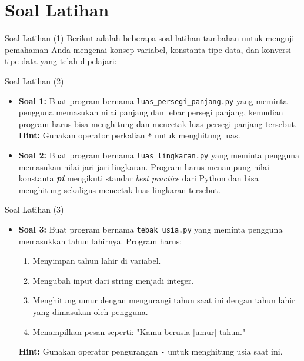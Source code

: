 \documentclass[aspectratio=169, table]{beamer}
\begin{document}
\section{Soal Latihan}
\begin{frame}{Soal Latihan (1)}
Berikut adalah beberapa soal latihan tambahan untuk menguji pemahaman Anda mengenai konsep variabel, konstanta tipe data, dan konversi tipe data yang telah dipelajari:
\end{frame}

\begin{frame}[fragile]{Soal Latihan (2)}
\begin{itemize}
\item \textbf{Soal 1:} Buat program bernama \texttt{luas_persegi_panjang.py} yang meminta pengguna memasukan nilai panjang dan lebar persegi panjang, kemudian program harus bisa menghitung dan mencetak luas persegi panjang tersebut.
\newline \newline
\textbf{Hint:} Gunakan operator perkalian \texttt{*} untuk menghitung luas.

\item \textbf{Soal 2:} Buat program bernama \texttt{luas_lingkaran.py} yang meminta pengguna memasukan nilai jari-jari lingkaran. Program harus menampung nilai konstanta \textbf{\textit{pi}} mengikuti standar \textit{best practice} dari Python dan bisa menghitung sekaligus mencetak luas lingkaran tersebut.

\end{itemize}
\end{frame}

\begin{frame}[fragile]{Soal Latihan (3)}
\begin{itemize}
\item \textbf{Soal 3:} Buat program bernama \texttt{tebak_usia.py} yang meminta pengguna memasukkan tahun lahirnya. Program harus:
\begin{enumerate}
    \item Menyimpan tahun lahir di variabel.
    \item Mengubah input dari string menjadi integer.
    \item Menghitung umur dengan mengurangi tahun saat ini dengan tahun lahir yang dimasukan oleh pengguna.
    \item Menampilkan pesan seperti: "Kamu berusia [umur] tahun."
\end{enumerate}

\textbf{Hint:} Gunakan operator pengurangan \texttt{-} untuk menghitung usia saat ini.
\end{itemize}
\end{frame}
\end{document}
